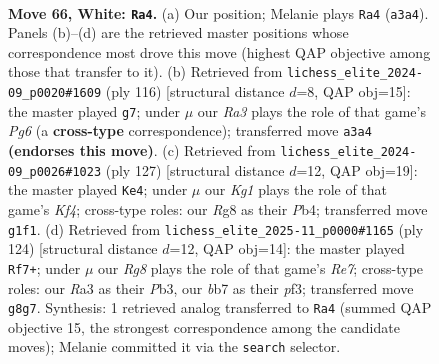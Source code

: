 \documentclass[11pt]{article}
\begin{document}
\clearpage

\begin{figure}[p]\centering
\begin{subfigure}{0.46\textwidth}\centering
\resizebox{\linewidth}{!}{%
\newchessgame
\chessboard[
  setfen={6R1/1b1k4/8/8/1P6/R7/1r6/6K1 w - - 5 66},
  showmover=false,
  pgfstyle=straightmove, color=movearrow, markmove={a3-a4}
]}
\caption{}
\end{subfigure}\hfill
\begin{subfigure}{0.46\textwidth}\centering
\resizebox{\linewidth}{!}{%
\newchessgame
\chessboard[
  setfen={R5K1/4k3/6P1/8/6P1/8/8/6r1 w - - 3 59},
  showmover=false,
  pgfstyle=straightmove, color=movearrow, markmove={g6-g7}
]}
\caption{}
\end{subfigure}
\\[4pt]
\begin{subfigure}{0.46\textwidth}\centering
\resizebox{\linewidth}{!}{%
\newchessgame
\chessboard[
  setfen={8/1r6/7R/5k2/1p5p/8/8/6BK b - - 0 64},
  showmover=false,
  pgfstyle=straightmove, color=movearrow, markmove={f5-e4}
]}
\caption{}
\end{subfigure}\hfill
\begin{subfigure}{0.46\textwidth}\centering
\resizebox{\linewidth}{!}{%
\newchessgame
\chessboard[
  setfen={8/4R2K/8/P7/5k2/1P3p2/r7/8 w - - 3 63},
  showmover=false,
  pgfstyle=straightmove, color=movearrow, markmove={e7-f7}
]}
\caption{}
\end{subfigure}
\caption{\textbf{Move 66, White: \texttt{Ra4}.} (a) Our position; Melanie plays \texttt{Ra4} (\texttt{a3a4}). Panels (b)--(d) are the retrieved master positions whose correspondence most drove this move (highest QAP objective among those that transfer to it). (b) Retrieved from \texttt{lichess\_elite\_2024-09\_p0020\#1609} (ply 116) [structural distance $d$=8, QAP obj=15]: the master played \texttt{g7}; under $\mu$ our \emph{Ra3} plays the role of that game's \emph{Pg6} (a \textbf{cross-type} correspondence); transferred move \texttt{a3a4} \textbf{(endorses this move)}. (c) Retrieved from \texttt{lichess\_elite\_2024-09\_p0026\#1023} (ply 127) [structural distance $d$=12, QAP obj=19]: the master played \texttt{Ke4}; under $\mu$ our \emph{Kg1} plays the role of that game's \emph{Kf4}; cross-type roles: our \emph{R}g8 as their \emph{P}b4; transferred move \texttt{g1f1}. (d) Retrieved from \texttt{lichess\_elite\_2025-11\_p0000\#1165} (ply 124) [structural distance $d$=12, QAP obj=14]: the master played \texttt{Rf7+}; under $\mu$ our \emph{Rg8} plays the role of that game's \emph{Re7}; cross-type roles: our \emph{R}a3 as their \emph{P}b3, our \emph{b}b7 as their \emph{p}f3; transferred move \texttt{g8g7}. Synthesis: 1 retrieved analog transferred to \texttt{Ra4} (summed QAP objective 15, the strongest correspondence among the candidate moves); Melanie committed it via the \texttt{search} selector.}
\label{fig:thought-m130}
\end{figure}
\end{document}
